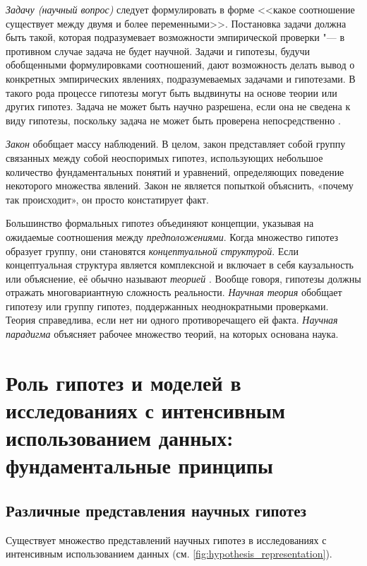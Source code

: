 \textit{Задачу (научный вопрос)} следует формулировать в форме <<какое соотношение существует между двумя и 
более переменными>>. Постановка задачи должна быть такой, которая подразумевает возможности эмпирической 
проверки "--- в противном случае задача не будет научной. Задачи и гипотезы, будучи обобщенными формулировками 
соотношений, дают возможность делать вывод о конкретных эмпирических явлениях, подразумеваемых задачами и гипотезами. 
В такого рода процессе гипотезы могут быть выдвинуты на основе теории или других гипотез. Задача не может быть научно 
разрешена, если она не сведена к виду гипотезы, поскольку задача не может быть проверена 
непосредственно \cite{Azorin1966}.

\textit{Закон} обобщает массу наблюдений. В целом, закон представляет собой группу связанных между собой неоспоримых 
гипотез, использующих небольшое количество фундаментальных понятий и уравнений, определяющих поведение некоторого 
множества явлений. Закон не является попыткой объяснить, «почему так происходит», он просто констатирует факт.

Большинство формальных гипотез объединяют концепции, указывая на ожидаемые соотношения между \textit{предположениями}. 
Когда множество гипотез образует группу, они становятся \textit{концептуальной структурой}. Если концептуальная 
структура является комплексной и включает в себя каузальность или объяснение, её обычно называют 
\textit{теорией} \cite{Hempel1952}. Вообще говоря, гипотезы должны отражать многовариантную сложность реальности. 
\textit{Научная теория} обобщает гипотезу или группу гипотез, поддержанных неоднократными проверками. Теория 
справедлива, если нет ни одного противоречащего ей факта. \textit{Научная парадигма} объясняет рабочее множество 
теорий, на которых основана наука.

\section{Роль гипотез и моделей в исследованиях с интенсивным 
         использованием данных: фундаментальные принципы}\label{sect1_2}

\subsection{Различные представления научных гипотез}\label{sect1_2_1}
Существует множество представлений научных гипотез в исследованиях 
с интенсивным использованием данных (см. \cref{fig:hypothesis_representation}).

